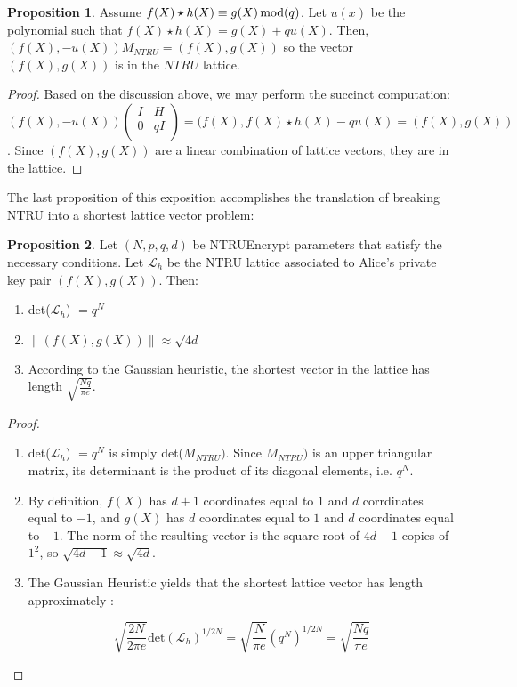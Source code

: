 \documentclass[12pt]{article}
\theoremstyle{definition}
\theoremstyle{proposition}
\newtheorem{proposition}{Proposition}[section]
\theoremstyle{remark}
\theoremstyle{theorem}
\theoremstyle{example}
\begin{document}
\begin{proposition}
    Assume $f(X)\star h(X) \equiv g(X) \thinspace \mathrm{mod}(q)$. Let $u(x)$ be the polynomial such that $f(X)\star h(X) = g(X) + qu(X)$. Then, $(f(X),-u(X))M_{NTRU} = (f(X),g(X))$ so the vector $(f(X),g(X))$ is in the $NTRU$ lattice.
\end{proposition}

\begin{proof}
    Based on the discussion above, we may perform the succinct computation: $(f(X),-u(X)) \begin{pmatrix}
I & H \\
0 & qI \\
\end{pmatrix} 
= (f(X), f(X) \star h(X) - qu(X) = (f(X), g(X))$. Since $(f(X), g(X))$ are a linear combination of lattice vectors, they are in the lattice.
\end{proof}

The last proposition of this exposition accomplishes the translation of breaking NTRU into a shortest lattice vector problem:

\begin{proposition}
    Let $(N,p,q,d)$ be NTRUEncrypt parameters that satisfy the necessary conditions. Let $\mathcal{L}_h$ be the NTRU lattice associated to Alice's private key pair $(f(X), g(X))$. Then:
    \begin{enumerate}
        \item det($\mathcal{L}_h$) $=q^N$
        \item $\left\| (f(X),g(X)) \right\| \approx \sqrt{4d}$
        \item According to the Gaussian heuristic, the shortest vector in the lattice has length $\sqrt{\frac{Nq}{\pi e}}$.
    \end{enumerate}
\end{proposition}

\begin{proof}
\begin{enumerate}
    \item det($\mathcal{L}_h$) $=q^N$ is simply det($M_{NTRU})$. Since $M_{NTRU})$ is an upper triangular matrix, its determinant is the product of its diagonal elements, i.e. $q^N$.
    \item By definition, $f(X)$ has $d+1$ coordinates equal to  $1$ and $d$ corrdinates equal to $-1$, and $g(X)$ has $d$ coordinates equal to $1$ and $d$ coordinates equal to $-1$. The norm of the resulting vector is the square root of $4d+1$ copies of $1^2$, so $\sqrt{4d+1} \approx \sqrt{4d}$. 
    \item The Gaussian Heuristic yields that the shortest lattice vector has length approximately :
    
    $$\sqrt{\frac{2N}{2\pi e}}\mathrm{det}(\mathcal{L}_h)^{1/2N} = \sqrt{\frac{N}{\pi e}}(q^N)^{1/2N} = \sqrt{\frac{Nq}{\pi e}}$$
\end{enumerate}
\end{proof}
\end{document}
